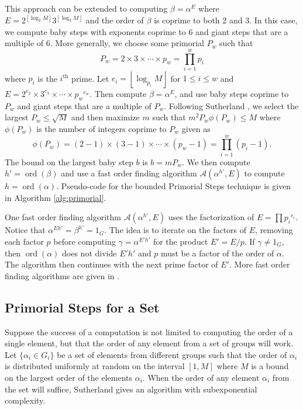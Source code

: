\documentclass{ucalgthes1}
\theoremstyle{definition}
\DeclareMathOperator{\ord}{ord}
\newcommand{\floor}[1]{\left\lfloor #1 \right\rfloor}
\begin{document}
This approach can be extended to computing $\beta = \alpha^E$ where $E = 2^{\floor{\log_2 M}} 3^{\floor{\log_3 M}}$ and the order of $\beta$ is coprime to both 2 and 3.  In this case, we compute baby steps with exponents coprime to 6 and giant steps that are a multiple of 6.  More generally, we choose some primorial $P_w$ such that
\[
	P_w = 2 \times 3 \times \cdots \times p_w = \prod_{i=1}^w p_i
\]
where $p_i$ is the $i^{\textrm{th}}$ prime.  Let $e_i = \floor{\log_{p_i} M}$ for $1 \le i \le w$ and $E = 2^{e_2} \times 3^{e_3} \times \cdots \times {p_w}^{e_w}$.  Then compute $\beta = \alpha^E$, and use baby steps coprime to $P_w$ and giant steps that are a multiple of $P_w$.  Following Sutherland \cite[p.57]{Sutherland2007}, we select the largest $P_w \le \sqrt{M}$ and then maximize $m$ such that $m^2P_w \phi(P_w) \le M$ where $\phi(P_w)$ is the number of integers coprime to $P_w$ given as
\begin{equation}
\label{eq:phiPrimorial}
	\phi(P_w) = (2-1) \times (3-1) \times \cdots \times (p_w - 1) = \prod_{i=1}^w (p_i - 1).
\end{equation}
The bound on the largest baby step $b$ is $b = m P_w$.  We then compute $h' = \ord(\beta)$ and use a fast order finding algorithm $\mathcal A(\alpha^{h'}, E)$ to compute $h = \ord(\alpha)$.  Pseudo-code for the bounded Primorial Steps technique is given in Algorithm \ref{alg:primorial}.

One fast order finding algorithm $\mathcal A(\alpha^{h'}, E)$ uses the factorization of $E=\prod {p_i}^{e_i}$.  Notice that $\alpha^{Eh'} = \beta^{h'} = 1_G$.  The idea is to iterate on the factors of $E$, removing each factor $p$ before computing $\gamma = \alpha^{E'h'}$ for the product $E' = E/p$. If $\gamma \neq 1_G$, then $\ord(\alpha)$ does not divide $E'h'$ and $p$ must be a factor of the order of $\alpha$.  The algorithm then continues with the next prime factor of $E'$.  More fast order finding algorithms are given in \cite[Chapter 7]{Sutherland2007}.

\subsection{Primorial Steps for a Set}

Suppose the success of a computation is not limited to computing the order of a single element, but that the order of any element from a set of groups will work.  Let $\{ \alpha_i \in G_i \}$ be a set of elements from different groups such that the order of $\alpha_i$ is distributed uniformly at random on the interval $[1, M]$ where $M$ is a bound on the largest order of the elements $\alpha_i$.  When the order of any element $\alpha_i$ from the set will suffice, Sutherland \cite[\S 5.4]{Sutherland2007} gives an algorithm with subexponential complexity.
\end{document}
